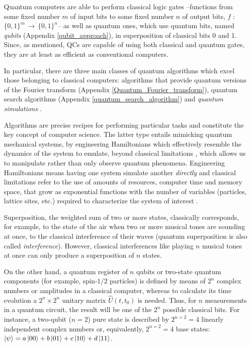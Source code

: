 \documentclass[11pt]{article}
\numberwithin{equation}{section} %
\numberwithin{figure}{section} %
\begin{document}
  Quantum computers are able to perform classical logic gates --functions from some fixed number $m$ of input bits to some fixed number $n$ of output bits, $f$ $:$ $\{0,1\}^m\,\rightarrow\,\{0,1\}^n$-- as well as quantum ones, which use quantum bits, named \emph{qubits} (Appendix \ref{qubit_approach}), in superposition of classical bits 0 and 1. Since, as mentioned, QCs are capable of using both classical and quantum gates, they are at least as efficient as conventional computers.
  
   In particular, there are three main classes of quantum algorithms which excel those belonging to classical computers: algorithms that provide quantum versions of the Fourier transform (Appendix \ref{Quantum_Fourier_transform}), quantum search algorithms (Appendix \ref{quantum_search_algorithm}) and \emph{quantum simulations} \cite[p.~37, l.~4-10]{Nielsen}  \cite[p.~1073, l.~65-68]{Lloyd}.

Algorithms are precise recipes for performing particular tasks and constitute the key concept of computer science. The latter type entails mimicking quantum mechanical systems, by engineering Hamiltonians which effectively resemble the dynamics of the system to emulate, beyond classical limitations \cite[p.~39, l.~5-8]{Nielsen}, which allows us to manipulate rather than only observe quantum phenomena. Engineering Hamiltonians means having one system simulate another \emph{directly} and classical limitations refer to the use of amounts of resources, computer time and memory space, that grow as exponential functions with the number of variables (particles, lattice sites, etc.) required to characterize the system of interest \cite[p.~1073, l.~89-95]{Lloyd}. 

Superposition, the weighted sum of two or more states, classically corresponds, for example, to the state of the air when two or more musical tones are sounding at once, to the classical interference of their waves (quantum superposition is also called \emph{interference}). However, classical interferences like playing $n$ musical tones at once can only produce a superposition of $n$ states.

On the other hand, a  quantum register of  $n$ qubits or two-state quantum components (for example, spin-$1/2$ particles) is defined by means of $2^n$ complex numbers or amplitudes in a classical computer,  whereas to calculate its time evolution a $2^n\times 2^n$ unitary matrix $\hat{U}(t,t_0)$ is needed. Thus, for $n$ measurements in a quantum circuit, the result will be one of the $2^n$ possible classical bits. For instance, a two-qubit ($n=2$) pure state is described by $2^{n=2}=4$ linearly independent complex numbers or, equivalently, $2^{n=2}=4$ base states: $\ket{\psi}=a\ket{00}+b\ket{01}+c\ket{10}+d\ket{11}$. 
\end{document}

